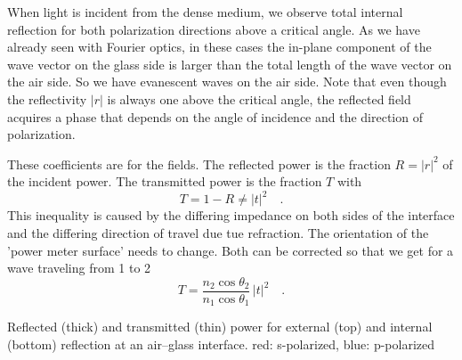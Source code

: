 When light is incident from the dense medium, we observe total internal reflection for both polarization directions above a critical angle. As we have already seen with Fourier optics, in these cases the in-plane component of the wave vector on the glass side is larger than the total length of the wave vector on the air side. So we have evanescent waves on the air side. Note that even though the reflectivity $|r|$ is always one above the critical angle, the reflected field acquires a phase that depends on the angle of incidence and the direction of polarization.


These coefficients are for the fields. The reflected power is the fraction $R = |r|^2$ of the incident power. The transmitted power is the fraction $T$ with
\begin{equation}
    T = 1 - R \neq |t|^2 \quad .
\end{equation}
This inequality is caused by the differing impedance on both sides of the interface and the differing direction of travel due tue refraction. The orientation of the 'power meter surface' needs to change. Both can be corrected so that we get for a wave traveling from 1 to 2
\begin{equation}
    T = \frac{n_2 \cos \theta_2}{n_1 \cos \theta_1} \, |t|^2 \quad .
\end{equation}




\begin{marginfigure}


\caption{Reflected (thick) and transmitted (thin) power for external (top) and internal (bottom) reflection at an air--glass interface. red: s-polarized, blue: p-polarized \label{fig:4_Fresnel_power}}

\end{marginfigure}




\printbibliography[segment=\therefsegment,heading=subbibliography]
